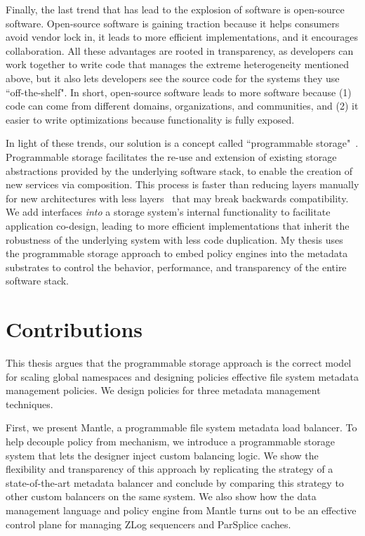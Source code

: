 Finally, the last trend that has lead to the explosion of software is
open-source software. Open-source software is gaining traction because it helps
consumers avoid vendor lock in, it leads to more efficient implementations, and
it encourages collaboration. All these advantages are rooted in transparency,
as developers can work together to write code that manages the extreme
heterogeneity mentioned above, but it also lets developers see the source code
for the systems they use ``off-the-shelf". In short, open-source software leads
to more software because (1) code can come from different domains,
organizations, and communities, and (2) it easier to write optimizations
because functionality is fully exposed.

In light of these trends, our solution is a concept called ``programmable
storage"~\cite{sevilla:eurosys17-malacology, watkins:hot17-declstor}.
Programmable storage facilitates the re-use and extension of existing storage
abstractions provided by the underlying software stack, to enable the creation
of new services via composition. This process is faster than reducing layers
manually for new architectures with less layers~\cite{bent:login16-hpc-trends}
that may break backwards compatibility.  We add interfaces {\it into} a storage
system's internal functionality to facilitate application co-design, leading to
more efficient implementations that inherit the robustness of the underlying
system with less code duplication. My thesis uses the programmable storage
approach to embed policy engines into the metadata substrates to control the
behavior, performance, and transparency of the entire software stack.

\section{Contributions}

This thesis argues that the programmable storage approach is the correct model
for scaling global namespaces and designing policies effective file system
metadata management policies. We design policies for three metadata management
techniques.

First, we present Mantle, a programmable file system metadata load balancer.
To help decouple policy from mechanism, we introduce a programmable storage
system that lets the designer inject custom balancing logic. We show the
flexibility and transparency of this approach by replicating the strategy of a
state-of-the-art metadata balancer and conclude by comparing this strategy to
other custom balancers on the same system. We also show how the data management
language and policy engine from Mantle turns out to be an effective control
plane for managing ZLog sequencers and ParSplice caches.  

